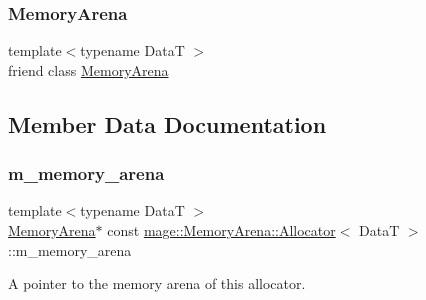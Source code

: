 \subsubsection{\texorpdfstring{Memory\+Arena}{MemoryArena}}
{\footnotesize\ttfamily template$<$typename DataT $>$ \\
friend class \hyperlink{classmage_1_1_memory_arena}{Memory\+Arena}\hspace{0.3cm}{\ttfamily [friend]}}



\subsection{Member Data Documentation}
\hypertarget{structmage_1_1_memory_arena_1_1_allocator_a821cb29f5f5c5d1581f87e9dac143d53}{}\label{structmage_1_1_memory_arena_1_1_allocator_a821cb29f5f5c5d1581f87e9dac143d53} 
\subsubsection{\texorpdfstring{m\+\_\+memory\+\_\+arena}{m\_memory\_arena}}
{\footnotesize\ttfamily template$<$typename DataT $>$ \\
\hyperlink{classmage_1_1_memory_arena}{Memory\+Arena}$\ast$ const \hyperlink{structmage_1_1_memory_arena_1_1_allocator}{mage\+::\+Memory\+Arena\+::\+Allocator}$<$ DataT $>$\+::m\+\_\+memory\+\_\+arena\hspace{0.3cm}{\ttfamily [private]}}

A pointer to the memory arena of this allocator. 